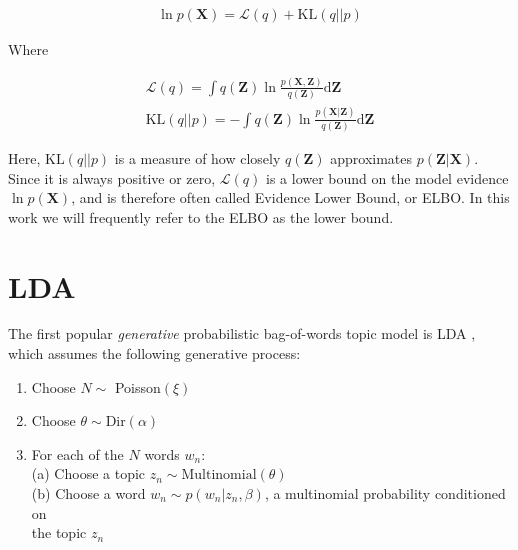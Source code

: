 \documentclass{report}
\begin{document}
\begin{align}\label{lowKL}
\ln p(\mathbf{X}) = \mathcal{L}(q) + \text{KL}(q||p)
\end{align}

Where

\begin{align}
\mathcal{L}(q) = \int q(\mathbf{Z}) \ln \frac{p(\mathbf{X},\mathbf{{Z}})}{q(\mathbf{Z})}\text{d}\mathbf{Z} \label{elbodecom}\\
\text{KL}(q||p) = -\int q(\mathbf{Z}) \ln \frac{p(\mathbf{X}|\mathbf{{Z}})}{q(\mathbf{Z})}\text{d}\mathbf{Z}
\end{align}

Here, $\text{KL}(q||p)$ is a measure of how closely $q(\mathbf{Z})$ approximates $p(\mathbf{Z|X})$. Since it is always positive or zero, $\mathcal{L}(q)$ is a lower bound on the model evidence $\ln p(\mathbf{X})$, and is therefore often called Evidence Lower Bound, or ELBO. In this work we will frequently refer to the ELBO as the lower bound. \\



\section{LDA}\label{LDA}
The first popular \textit{generative} probabilistic bag-of-words topic model is LDA \cite{blei2003latent}, which assumes the following generative process:

\begin{enumerate}\label{lda_algo}\itemsep3pt
	\item{Choose $N \sim$ Poisson$(\xi)$}
	\item{Choose $\theta \sim \text{Dir}(\alpha)$}
	\item{For each of the $N$ words $w_n$:\\ 
		\tabto{1.5cm} (a) Choose a topic $z_n \sim \text{Multinomial}(\theta)$\\
		\tabto{1.5cm} (b) Choose a word  $w_n \sim p(w_n|z_n,\beta)$, a multinomial probability conditioned on \\ \tabto{2.23cm}the topic $z_n$}
\end{enumerate}
\end{document}
